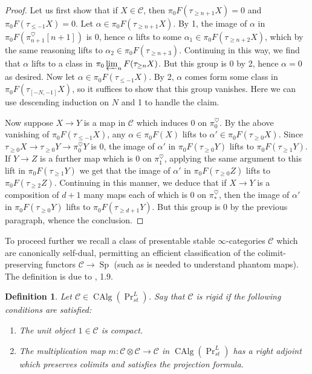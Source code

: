 \documentclass[12pt]{article}
\newtheorem{definition}[theorem]{Definition}
\newcommand{\on}{\operatorname}
\newcommand{\heart}{\heartsuit}
\begin{document}
\begin{proof}
Let us first show that if $X\in\mathcal{C}$, then $\pi_0 F(\tau_{\geq n+1}X)=0$ and $\pi_0 F(\tau_{\leq -1}X)=0$.   Let $\alpha\in \pi_0 F(\tau_{\geq n+1}X)$.  By 1, the image of $\alpha$ in $\pi_0 F(\pi^{\heart}_{n+1}[n+1])$ is 0, hence $\alpha$ lifts to some $\alpha_1 \in \pi_0 F(\tau_{\geq n+2}X)$, which by the same reasoning lifts to $\alpha_2 \in \pi_0 F(\tau_{\geq n+3})$.  Continuing in this way, we find that $\alpha$ lifts to a class in $\pi_0 \varprojlim_n F(\tau_{\geq n}X)$.  But this group is $0$ by 2, hence $\alpha=0$ as desired.  Now let $\alpha \in \pi_0 F(\tau_{\leq -1}X)$.  By 2, $\alpha$ comes form some class in $\pi_0 F(\tau_{[-N,-1]}X)$, so it suffices to show that this group vanishes.  Here we can use descending induction on $N$ and 1 to handle the claim.

Now suppose $X\to Y$ is a map in $\mathcal{C}$ which induces $0$ on $\pi^{\heart}_0$.  By the above vanishing of $\pi_0 F(\tau_{\leq -1}X)$, any $\alpha \in \pi_0F(X)$ lifts to $\alpha' \in \pi_0F(\tau_{\geq 0}X)$.  Since $\tau_{\geq 0}X \to \tau_{\geq 0}Y \to \pi^\heart_0Y$ is $0$, the image of $\alpha'$ in $\pi_0 F(\tau_{\geq 0}Y)$ lifts to $\pi_0 F(\tau_{\geq 1}Y)$.  If $Y\to Z$ is a further map which is $0$ on $\pi^\heart_1$, applying the same argument to this lift in $\pi_0 F(\tau_{\geq 1}Y)$ we get that the image of $\alpha'$ in $\pi_0F(\tau_{\geq 0}Z)$ lifts to $\pi_0 F(\tau_{\geq 2}Z)$. Continuing in this manner, we deduce that if $X\to Y$ is a composition of $d+1$ many maps each of which is $0$ on $\pi^\heart_\ast$, then the image of $\alpha'$ in $\pi_0F (\tau_{\geq 0}Y)$ lifts to $\pi_0 F(\tau_{\geq d+1}Y)$.  But this group is $0$ by the previous paragraph, whence the conclusion.
\end{proof}

To proceed further we recall a class of presentable stable $\infty$-categories $\mathcal{C}$ which are canonically self-dual, permitting an efficient classification of the colimit-preserving functors $\mathcal{C}\to\on{Sp}$ (such as is needed to understand phantom maps).  The definition is due to \cite{GaitsgoryDerivedI}, 1.9.

\begin{definition}\label{defrigid}
Let $\mathcal{C}\in \on{CAlg}(\on{Pr}_{st}^L)$.  Say that $\mathcal{C}$ is \emph{rigid} if the following conditions are satisfied:
\begin{enumerate}
\item The unit object $1\in\mathcal{C}$ is compact.
\item The multiplication map $m:\mathcal{C}\otimes\mathcal{C}\to\mathcal{C}$ in $\on{CAlg}(\on{Pr}^L_{st})$ has a right adjoint which preserves colimits and satisfies the projection formula.
\end{enumerate}
\end{definition}
\end{document}
